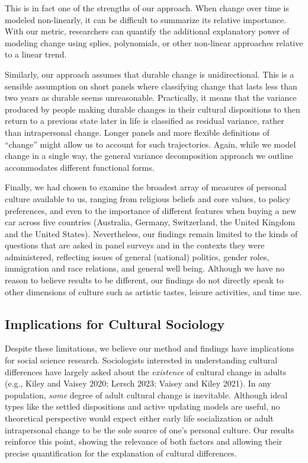 \documentclass[
  11pt,
]{article}
\begin{document}
This is in fact one of the strengths of our approach. When change over
time is modeled non-linearly, it can be difficult to summarize its
relative importance. With our metric, researchers can quantify the
additional explanatory power of modeling change using splies,
polynomials, or other non-linear approaches relative to a linear trend.

Similarly, our approach assumes that durable change is unidirectional.
This is a sensible assumption on short panels where classifying change
that lasts less than two years as durable seems unreasonable.
Practically, it means that the variance produced by people making
durable changes in their cultural dispositions to then return to a
previous state later in life is classified as residual variance, rather
than intrapersonal change. Longer panels and more flexible definitions
of ``change'' might allow us to account for such trajectories. Again,
while we model change in a single way, the general variance
decomposition approach we outline accommodates different functional
forms.

Finally, we had chosen to examine the broadest array of measures of
personal culture available to us, ranging from religious beliefs and
core values, to policy preferences, and even to the importance of
different features when buying a new car across five countries
(Australia, Germany, Switzerland, the United Kingdom and the United
States). Nevertheless, our findings remain limited to the kinds of
questions that are asked in panel surveys and in the contexts they were
administered, reflecting issues of general (national) politics, gender
roles, immigration and race relations, and general well being. Although
we have no reason to believe results to be different, our findings do
not directly speak to other dimensions of culture such as artistic
tastes, leisure activities, and time use.

\subsection{Implications for Cultural
Sociology}\label{implications-for-cultural-sociology}

Despite these limitations, we believe our method and findings have
implications for social science research. Sociologists interested in
understanding cultural differences have largely asked about the
\emph{existence} of cultural change in adults (e.g., Kiley and Vaisey
2020; Lersch 2023; Vaisey and Kiley 2021). In any population,
\emph{some} degree of adult cultural change is inevitable. Although
ideal types like the settled dispositions and active updating models are
useful, no theoretical perspective would expect either early life
socialization or adult intrapersonal change to be the sole source of
one's personal culture. Our results reinforce this point, showing the
relevance of both factors and allowing their precise quantification for
the explanation of cultural differences.
\end{document}
